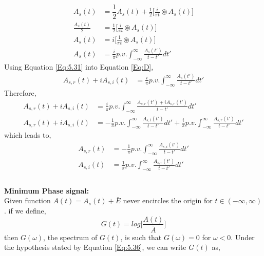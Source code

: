 \begin{equation}
\begin{split}
{A_s}(t)&=\dfrac{1}{2}{A_s}(t)+\frac{1}{2}\bigg[\frac{i}{\pi t} \circledast {A_s}(t) \bigg]\\
\frac{{A_s}(t)}{2} &=\frac{1}{2}\bigg[\frac{i}{\pi t} \circledast {A_s}(t) \bigg]\\
{A_s}(t) &=i\bigg[\frac{1}{\pi t} \circledast {A_s}(t) \bigg]\\
{A_s}(t) &=\frac{i}{\pi} p.v. \int_{-\infty}^{\infty} \frac{A_s(t')}{t-t'} dt' 
\end{split}
\label{Eq:D}
\end{equation}
Using Equation \ref{Eq:5.31} into Equation \ref{Eq:D},
\begin{equation}
\begin{split}
A_{s,r}(t)+iA_{s,i}(t) &=\frac{i}{\pi} p.v. \int_{-\infty}^{\infty} \frac{A_s(t')}{t-t'} dt' 
\end{split}
\label{Eq:5.36}
\end{equation}
Therefore,
\begin{equation}
\begin{split}
A_{s,r}(t)+iA_{s,i}(t) &=\frac{i}{\pi} p.v. \int_{-\infty}^{\infty} \frac{A_{s,r}(t')+iA_{s,r}(t')}{t-t'} dt' \\
A_{s,r}(t)+iA_{s,i}(t)&=-\frac{1}{\pi} p.v. \int_{-\infty}^{\infty} \frac{A_{s,i}(t')}{t-t'} dt' + \frac{i}{\pi} p.v. \int_{-\infty}^{\infty} \frac{A_{s,r}(t')}{t-t'} dt'
\end{split}
\label{Eq:5.37}
\end{equation}
which leads to,
\begin{equation}
\begin{split}
A_{s,r}(t) &=-\frac{1}{\pi} p.v. \int_{-\infty}^{\infty} \frac{A_{s,i}(t')}{t-t'} dt' \\
A_{s,i}(t) &=\frac{1}{\pi} p.v. \int_{-\infty}^{\infty} \frac{A_{s,r}(t')}{t-t'} dt' \\
\end{split}
\label{Eq:5.38}
\end{equation}\\
\textbf{Minimum Phase signal:}\\
Given function $A(t)=A_{s}(t)+\bar{E}$ never encircles the origin for $t\in(-\infty,\infty)$. if we define,
\begin{equation}
G(t)=log\bigg[\dfrac{A(t)}{\bar{A}}\bigg]
\label{Eq:A1}
\end{equation} 
then $G(\omega)$, the spectrum of $G(t)$, is such that $G(\omega)=0$ for $\omega<0$. Under the hypothesis stated by Equation \ref{Eq:5.36}, we can write $G(t)$ as,
